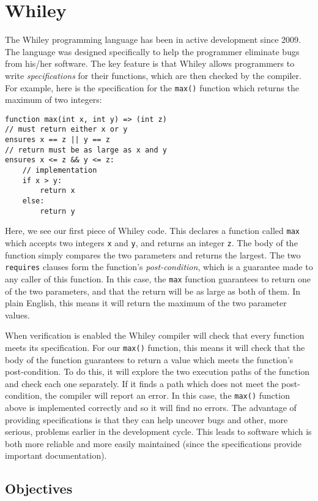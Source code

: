 \section{Whiley}
The Whiley programming language has been in active development since 2009.  The language was designed specifically to help the programmer eliminate bugs from his/her software.  The key feature is that Whiley allows programmers to write {\em specifications} for their functions, which are then checked by the compiler.  For example, here is the specification for the \lstinline{max()} function which returns the maximum of two integers:

\begin{tcolorbox}\begin{lstlisting}[language=Whiley]
function max(int x, int y) => (int z)
// must return either x or y
ensures x == z || y == z
// return must be as large as x and y
ensures x <= z && y <= z:
    // implementation
    if x > y:
        return x
    else:
        return y
\end{lstlisting}\end{tcolorbox}

Here, we see our first piece of Whiley code.  This declares a function called \lstinline{max} which accepts two integers \lstinline{x} and \lstinline{y}, and returns an integer \lstinline{z}.  The body of the function simply compares the two parameters and returns the largest.
The two \lstinline{requires} clauses form the function's {\em post-condition}, which is a guarantee made to any caller of this function.  In this case, the \lstinline{max} function guarantees to return one of the two parameters, and that the return will be as large as both of them.  In plain English, this means it will return the maximum of the two parameter values.

When verification is enabled the Whiley compiler will check that every function meets its specification.  For our \lstinline{max()} function,
this means it will check that the body of the function guarantees to return a value which meets the function's post-condition.  To do this, it will explore the two execution paths of the function and check each one separately.  If it finds a path which does not meet the post-condition, the compiler will report an error.  In this case, the \lstinline{max()} function above is implemented correctly and so it will find no errors.  The advantage of providing specifications is that they can help uncover bugs and other, more serious, problems earlier in the development cycle.  This leads to software which is both more reliable and more easily maintained (since the specifications provide important documentation).

\subsection{Objectives}
